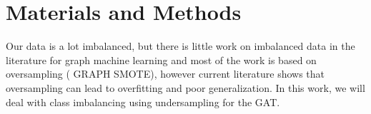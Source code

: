 \chapter[Materials and Methods]{Materials and Methods}
\label{Materials}

Our data is a lot imbalanced, but there is little work on imbalanced data in the literature for graph machine learning and most of the work is based on oversampling (\cite{GraphSmote} GRAPH SMOTE), however current literature shows that oversampling can lead to overfitting and poor generalization. In this work, we will deal with class imbalancing using undersampling for the GAT.  



% 

% 





